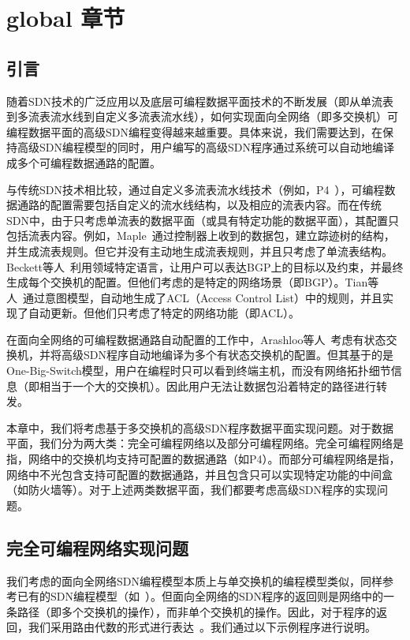 \chapter{global 章节}

\section{引言}

随着SDN技术的广泛应用以及底层可编程数据平面技术的不断发展（即从单流表到多流表流水线到自定义多流表流水线），如何实现面向全网络（即多交换机）可编程数据平面的高级SDN编程变得越来越重要。具体来说，我们需要达到，在保持高级SDN编程模型的同时，用户编写的高级SDN程序通过系统可以自动地编译成多个可编程数据通路的配置。

与传统SDN技术相比较，通过自定义多流表流水线技术（例如，P4~\cite{P4}），可编程数据通路的配置需要包括自定义的流水线结构，以及相应的流表内容。而在传统SDN中，由于只考虑单流表的数据平面（或具有特定功能的数据平面），其配置只包括流表内容。例如，Maple~\cite{voellmy2013maple}通过控制器上收到的数据包，建立踪迹树的结构，并生成流表规则。但它并没有主动地生成流表规则，并且只考虑了单流表结构。Beckett等人~\cite{beckett2016don}利用领域特定语言，让用户可以表达BGP上的目标以及约束，并最终生成每个交换机的配置。但他们考虑的是特定的网络场景（即BGP）。Tian等人~\cite{tian2019safely}通过意图模型，自动地生成了ACL（Access Control List）中的规则，并且实现了自动更新。但他们只考虑了特定的网络功能（即ACL）。

在面向全网络的可编程数据通路自动配置的工作中，Arashloo等人~\cite{snap}考虑有状态交换机，并将高级SDN程序自动地编译为多个有状态交换机的配置。但其基于的是One-Big-Switch模型，用户在编程时只可以看到终端主机，而没有网络拓扑细节信息（即相当于一个大的交换机）。因此用户无法让数据包沿着特定的路径进行转发。

本章中，我们将考虑基于多交换机的高级SDN程序数据平面实现问题。对于数据平面，我们分为两大类：完全可编程网络以及部分可编程网络。完全可编程网络是指，网络中的交换机均支持可配置的数据通路（如P4）。而部分可编程网络是指，网络中不光包含支持可配置的数据通路，并且包含只可以实现特定功能的中间盒（如防火墙等）。对于上述两类数据平面，我们都要考虑高级SDN程序的实现问题。

\section{完全可编程网络实现问题}

我们考虑的面向全网络SDN编程模型本质上与单交换机的编程模型类似，同样参考已有的SDN编程模型（如~\cite{snap,sivaraman2016packet}）。但面向全网络的SDN程序的返回则是网络中的一条路径（即多个交换机的操作），而非单个交换机的操作。因此，对于程序的返回，我们采用路由代数的形式进行表达~\cite{gao2018t}。我们通过以下示例程序进行说明。

